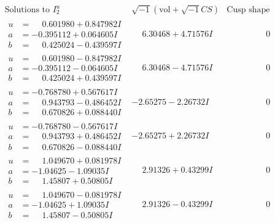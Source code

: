 \documentclass[1p]{elsarticle_modified}
\theoremstyle{definition}
\newcommand{\I}{\sqrt{-1}}
\begin{document}
$$\begin{array}{c|c|c}  
\text{Solutions to }I^u_{2}& \I (\text{vol} + \sqrt{-1}CS) & \text{Cusp shape}\\
 \hline 
\begin{aligned}
u &= \phantom{-}0.601980 + 0.847982 I \\
a &= -0.395112 + 0.064605 I \\
b &= \phantom{-}0.425024 - 0.439597 I\end{aligned}
 & \phantom{-}6.30468 + 4.71576 I & \phantom{-0.000000 } 0 \\ \hline\begin{aligned}
u &= \phantom{-}0.601980 - 0.847982 I \\
a &= -0.395112 - 0.064605 I \\
b &= \phantom{-}0.425024 + 0.439597 I\end{aligned}
 & \phantom{-}6.30468 - 4.71576 I & \phantom{-0.000000 } 0 \\ \hline\begin{aligned}
u &= -0.768780 + 0.567617 I \\
a &= \phantom{-}0.943793 - 0.486452 I \\
b &= \phantom{-}0.670826 + 0.088440 I\end{aligned}
 & -2.65275 - 2.26732 I & \phantom{-0.000000 } 0 \\ \hline\begin{aligned}
u &= -0.768780 - 0.567617 I \\
a &= \phantom{-}0.943793 + 0.486452 I \\
b &= \phantom{-}0.670826 - 0.088440 I\end{aligned}
 & -2.65275 + 2.26732 I & \phantom{-0.000000 } 0 \\ \hline\begin{aligned}
u &= \phantom{-}1.049670 + 0.081978 I \\
a &= -1.04625 - 1.09035 I \\
b &= \phantom{-}1.45807 + 0.50805 I\end{aligned}
 & \phantom{-}2.91326 + 0.43299 I & \phantom{-0.000000 } 0 \\ \hline\begin{aligned}
u &= \phantom{-}1.049670 - 0.081978 I \\
a &= -1.04625 + 1.09035 I \\
b &= \phantom{-}1.45807 - 0.50805 I\end{aligned}
 & \phantom{-}2.91326 - 0.43299 I & \phantom{-0.000000 } 0 \\ \hline\begin{aligned}

\end{aligned}
\end{array}$$
\end{document}

